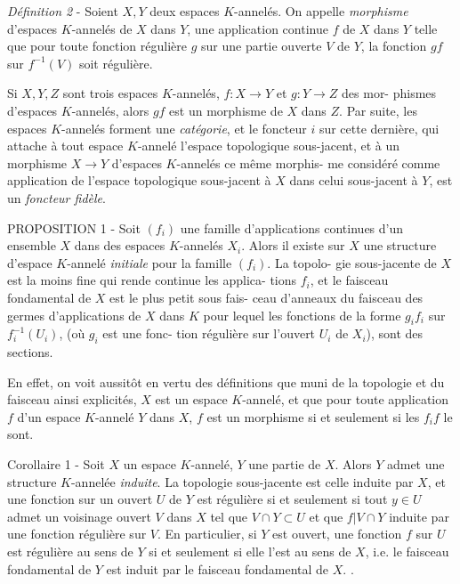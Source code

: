 \emph{Définition 2} - Soient $X, Y$ deux espaces $K$-annelés. On appelle \emph{morphisme}
d'espaces $K$-annelés de $X$ dans $Y$, une application continue $f$ de $X$ dans $Y$
telle que pour toute fonction régulière $g$ sur une partie ouverte $V$ de $Y$,
la fonction $gf$ sur $f^{-1}(V)$ soit régulière.

Si $X, Y, Z$ sont trois espaces $K$-annelés, $f: X \to Y$ et $g: Y \to Z$ des mor-
phismes d'espaces $K$-annelés, alors $gf$ est un morphisme de $X$ dans $Z$. Par
suite, les espaces $K$-annelés forment une \emph{catégorie}, et le foncteur $i$ sur
cette dernière, qui attache à tout espace $K$-annelé l'espace topologique
sous-jacent, et à un morphisme $X \to Y$ d'espaces $K$-annelés ce même morphis-
me considéré comme application de l'espace topologique sous-jacent à $X$
dans celui sous-jacent à $Y$, est un \emph{foncteur fidèle}.

\newpage



PROPOSITION 1 - Soit $(f_i)$ une famille d'applications continues d'un
ensemble $X$ dans des espaces $K$-annelés $X_i$. Alors il existe sur $X$ une
structure d'espace $K$-annelé \emph{initiale} pour la famille $(f_i)$. La topolo-
gie sous-jacente de $X$ est la moins fine qui rende continue les applica-
tions $f_i$, et le faisceau fondamental de $X$ est le plus petit sous fais-
ceau d'anneaux du faisceau des germes d'applications de $X$ dans $K$ pour
lequel les fonctions de la forme $g_i f_i$ sur $f_i^{-1}(U_i)$, (où $g_i$ est une fonc-
tion régulière sur l'ouvert $U_i$ de $X_i$), sont des sections.

En effet, on voit aussitôt en vertu des définitions que muni de la
topologie et du faisceau ainsi explicités, $X$ est un espace $K$-annelé, et
que pour toute application $f$ d'un espace $K$-annelé $Y$ dans $X$, $f$ est un
morphisme si et seulement si les $f_i f$ le sont.

Corollaire 1 - Soit $X$ un espace $K$-annelé, $Y$ une partie de $X$. Alors $Y$
admet une structure $K$-annelée \emph{induite}. La topologie sous-jacente est
celle induite par $X$, et une fonction sur un ouvert $U$ de $Y$ est régulière
si et seulement si tout $y \in U$ admet un voisinage ouvert $V$ dans $X$ tel que
$V \cap Y \subset U$ et que $f|V \cap Y$ induite par une fonction régulière sur $V$. En
particulier, si $Y$ est ouvert, une fonction $f$ sur $U$ est régulière au
sens de $Y$ si et seulement si elle l'est au sens de $X$, i.e. le faisceau
fondamental de $Y$ est induit par le faisceau fondamental de $X$. .


